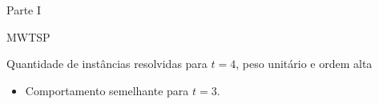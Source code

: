\documentclass[dvipsnames]{beamer}
\begin{document}
\begin{frame}{Parte I}
  \begin{center}
    MWTSP
  \end{center}
\end{frame}

\begin{frame}{Quantidade de instâncias resolvidas para $t = 4$, peso unitário e ordem alta}
  \begin{figure}[t]%
    \caption{}%
    \label{fig:tree_sf4_s40_50_unit}%
  \end{figure}

  \begin{itemize}
    \item Comportamento semelhante para $t = 3$.
    \end{itemize}
\end{frame}
  
\end{document}
